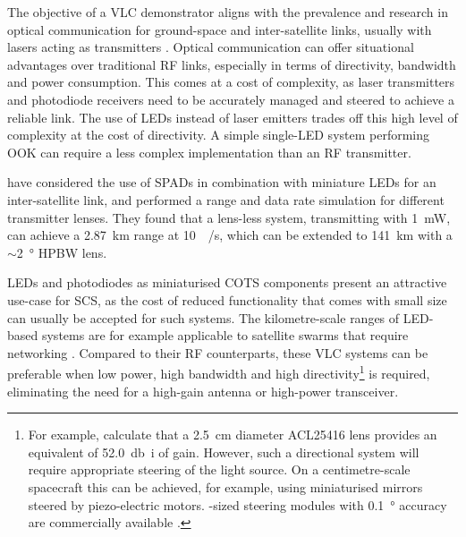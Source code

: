 \documentclass[a4paper,nobib,justified,final]{tufte-book}
\begin{document}
The objective of a \ac{VLC} demonstrator aligns with the prevalence and research in optical communication for ground-space and inter-satellite links, usually with lasers acting as transmitters \autocite{kaushalOpticalCommunicationSpace2017,khalighiSurveyFreeSpace2014,griffithsHighsensitivityIntersatelliteOptical2021}. Optical communication can offer situational advantages over traditional \ac{RF} links, especially in terms of directivity, bandwidth and power consumption. This comes at a cost of complexity, as laser transmitters and photodiode receivers need to be accurately managed and steered to achieve a reliable link. The use of \acfp{LED} instead of laser emitters trades off this high level of complexity at the cost of directivity. A simple single-\acs{LED} system performing \acf{OOK} can require a less complex implementation than an \ac{RF} transmitter.

\citeauthor{griffithsHighsensitivityIntersatelliteOptical2021} \autocite{griffithsHighsensitivityIntersatelliteOptical2021} have considered the use of \acp{SPAD} in combination with miniature \acp{LED} for an inter-satellite link, and performed a range and data rate simulation for different transmitter lenses. They found that a lens-less system, transmitting with \SI{1}{\milli\watt}, can achieve a \SI{2.87}{\kilo\meter} range at \SI{10}{\kilo\bit/\second}, which can be extended to \SI{141}{\kilo\meter} with a \( \sim \)\SI{2}{\degree} \acf{HPBW} lens.

\acsp{LED} and photodiodes as miniaturised \acs{COTS} components present an attractive use-case for \ac{SCS}, as the cost of reduced functionality that comes with small size can usually be accepted for such systems. The kilometre-scale ranges of \acs{LED}-based systems are for example applicable to satellite swarms that require networking \autocite{timmonsRangeBasedRelativeNavigation2022}. Compared to their \ac{RF} counterparts, these \ac{VLC} systems can be preferable when low power, high bandwidth and high directivity\footnote{For example, \citeauthor{griffithsHighsensitivityIntersatelliteOptical2021} \autocite{griffithsHighsensitivityIntersatelliteOptical2021} calculate that a \SI{2.5}{\centi\meter} diameter ACL25416 lens provides an equivalent of \SI{52.0}{\decibel i} of gain. However, such a directional system will require appropriate steering of the light source. On a centimetre-scale spacecraft this can be achieved, for example, using miniaturised mirrors steered by piezo-electric motors. -sized steering modules with \SI{0.1}{\degree} accuracy are commercially available \autocite{M3MicroBeamSteeringTechBulletin}.} is required, eliminating the need for a high-gain antenna or high-power transceiver.
\end{document}
